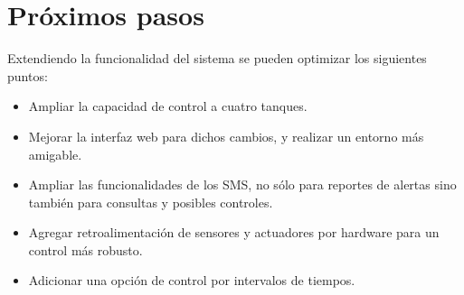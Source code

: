 \section{Próximos pasos}

Extendiendo la funcionalidad del sistema se pueden optimizar los siguientes puntos:
  \begin{itemize}
    \item Ampliar la capacidad de control a cuatro tanques.
    \item Mejorar la interfaz web para dichos cambios, y realizar un entorno más amigable.
    \item Ampliar las funcionalidades de los SMS, no sólo para reportes de alertas sino también para consultas y posibles controles. 
    \item Agregar retroalimentación de sensores y actuadores por hardware para un control más robusto.
    \item Adicionar una opción de control por intervalos de tiempos. 
   \end{itemize} 

